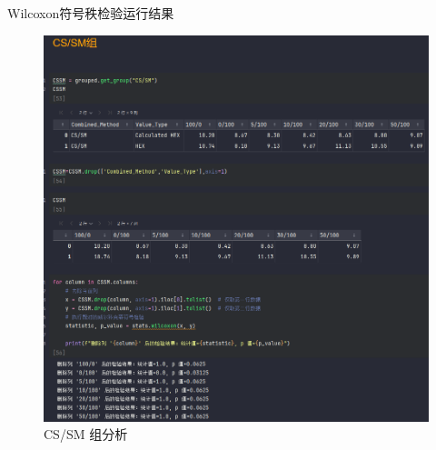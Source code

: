 \documentclass{beamer}
\begin{document}
\begin{frame}{Wilcoxon符号秩检验运行结果}
\begin{figure}[htbp]
\begin{minipage}{0.4\linewidth}
            \includegraphics[width=\linewidth]{pic/path_to_image2.png} %
            \caption{CS/SM 组分析}
        \end{minipage}
    \end{figure}
\end{frame}
\end{document}
